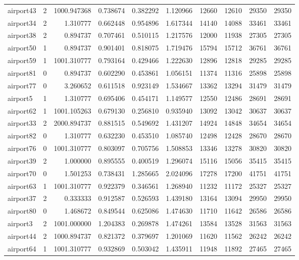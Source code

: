 \begin{longtable}{|l|r|r|r|r|r|r|r|r|r|}
airport43 & 2 & 1000.947368 & 0.738674 & 0.382292 & 1.120966 & 12660 & 12610 & 29350 & 29350 \\
airport34 & 2 & 1.310777 & 0.662448 & 0.954896 & 1.617344 & 14140 & 14088 & 33461 & 33461 \\
airport38 & 2 & 0.894737 & 0.707461 & 0.510115 & 1.217576 & 12000 & 11938 & 27305 & 27305 \\
airport50 & 1 & 0.894737 & 0.901401 & 0.818075 & 1.719476 & 15794 & 15712 & 36761 & 36761 \\
airport59 & 1 & 1001.310777 & 0.793164 & 0.429466 & 1.222630 & 12896 & 12818 & 29285 & 29285 \\
airport81 & 0 & 0.894737 & 0.602290 & 0.453861 & 1.056151 & 11374 & 11316 & 25898 & 25898 \\
airport77 & 0 & 3.260652 & 0.611518 & 0.923149 & 1.534667 & 13362 & 13294 & 31479 & 31479 \\
airport5 & 1 & 1.310777 & 0.695406 & 0.454171 & 1.149577 & 12550 & 12486 & 28691 & 28691 \\
airport62 & 1 & 1001.105263 & 0.679130 & 0.256810 & 0.935940 & 13092 & 13042 & 30637 & 30637 \\
airport33 & 2 & 2000.894737 & 0.881515 & 0.549692 & 1.431207 & 14924 & 14848 & 34654 & 34654 \\
airport82 & 0 & 1.310777 & 0.632230 & 0.453510 & 1.085740 & 12498 & 12428 & 28670 & 28670 \\
airport76 & 0 & 1001.310777 & 0.803097 & 0.705756 & 1.508853 & 13346 & 13278 & 30820 & 30820 \\
airport39 & 2 & 1.000000 & 0.895555 & 0.400519 & 1.296074 & 15116 & 15056 & 35415 & 35415 \\
airport70 & 0 & 1.501253 & 0.738431 & 1.285665 & 2.024096 & 17278 & 17200 & 41751 & 41751 \\
airport63 & 1 & 1001.310777 & 0.922379 & 0.346561 & 1.268940 & 11232 & 11172 & 25327 & 25327 \\
airport37 & 2 & 0.333333 & 0.912587 & 0.526593 & 1.439180 & 13164 & 13094 & 29950 & 29950 \\
airport80 & 0 & 1.468672 & 0.849544 & 0.625086 & 1.474630 & 11710 & 11642 & 26586 & 26586 \\
airport3 & 2 & 1001.000000 & 1.204383 & 0.269878 & 1.474261 & 13584 & 13528 & 31563 & 31563 \\
airport44 & 2 & 1000.894737 & 0.821372 & 0.379697 & 1.201069 & 11620 & 11562 & 26242 & 26242 \\
airport64 & 1 & 1001.310777 & 0.932869 & 0.503042 & 1.435911 & 11948 & 11892 & 27465 & 27465 \\

\end{longtable}
